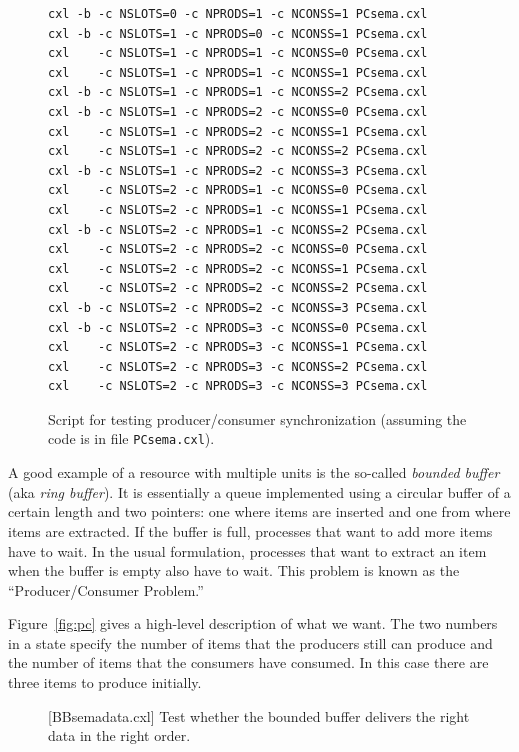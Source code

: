 \documentclass{report}
\newenvironment{code}{
\tcolorbox
}{
\endtcolorbox
}
\begin{document}
\begin{figure}
\begin{code}
\begin{verbatim}
cxl -b -c NSLOTS=0 -c NPRODS=1 -c NCONSS=1 PCsema.cxl
cxl -b -c NSLOTS=1 -c NPRODS=0 -c NCONSS=1 PCsema.cxl
cxl    -c NSLOTS=1 -c NPRODS=1 -c NCONSS=0 PCsema.cxl
cxl    -c NSLOTS=1 -c NPRODS=1 -c NCONSS=1 PCsema.cxl
cxl -b -c NSLOTS=1 -c NPRODS=1 -c NCONSS=2 PCsema.cxl
cxl -b -c NSLOTS=1 -c NPRODS=2 -c NCONSS=0 PCsema.cxl
cxl    -c NSLOTS=1 -c NPRODS=2 -c NCONSS=1 PCsema.cxl
cxl    -c NSLOTS=1 -c NPRODS=2 -c NCONSS=2 PCsema.cxl
cxl -b -c NSLOTS=1 -c NPRODS=2 -c NCONSS=3 PCsema.cxl
cxl    -c NSLOTS=2 -c NPRODS=1 -c NCONSS=0 PCsema.cxl
cxl    -c NSLOTS=2 -c NPRODS=1 -c NCONSS=1 PCsema.cxl
cxl -b -c NSLOTS=2 -c NPRODS=1 -c NCONSS=2 PCsema.cxl
cxl    -c NSLOTS=2 -c NPRODS=2 -c NCONSS=0 PCsema.cxl
cxl    -c NSLOTS=2 -c NPRODS=2 -c NCONSS=1 PCsema.cxl
cxl    -c NSLOTS=2 -c NPRODS=2 -c NCONSS=2 PCsema.cxl
cxl -b -c NSLOTS=2 -c NPRODS=2 -c NCONSS=3 PCsema.cxl
cxl -b -c NSLOTS=2 -c NPRODS=3 -c NCONSS=0 PCsema.cxl
cxl    -c NSLOTS=2 -c NPRODS=3 -c NCONSS=1 PCsema.cxl
cxl    -c NSLOTS=2 -c NPRODS=3 -c NCONSS=2 PCsema.cxl
cxl    -c NSLOTS=2 -c NPRODS=3 -c NCONSS=3 PCsema.cxl
\end{verbatim}
\end{code}
\caption{Script for testing producer/consumer synchronization
(assuming the code is in file \texttt{PCsema.cxl}).}
\label{fig:pcscript}
\end{figure}

A good example of a resource with multiple units is the
so-called \emph{bounded buffer} (aka \emph{ring buffer}).
It is essentially
a queue implemented using a circular buffer
of a certain length and two pointers:
one where items are inserted and one from where items are extracted.  If the
buffer is full, processes that want to add more items have to wait.  In the usual
formulation, processes that want to extract an item when the buffer is empty
also have to wait.
This problem is known as the ``Producer/Consumer Problem.''

Figure~\ref{fig:pc} gives a high-level description of what we want.  The
two numbers in a state specify
the number of items that the producers still can produce and
the number of items that the consumers have consumed.  In this case
there are three items to produce initially.

\begin{figure}
\begin{code}
\end{code}
\caption{[BBsemadata.cxl] Test whether the bounded buffer delivers the right data in the
right order.}
\label{fig:PCsemadata}
\end{figure}
\end{document}
